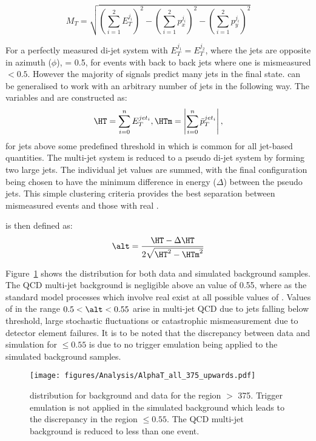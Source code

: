 \begin{equation}
  M_{T} = \sqrt{\left(\sum^{2}_{i=1}E_{T}^{j_{i}}\right)^{2} - \left(\sum^{2}_{i=1}p_{x}^{j_{i}}\right)^{2} - \left(\sum^{2}_{i=1}p_{y}^{j_{i}}\right)^{2}}
\end{equation}

For a perfectly measured di-jet system with $E_{T}^{j_{1}} = E_{T}^{j_{2}}$, 
where the jets are opposite in azimuth ($\phi$), \alt = 0.5, for events with back to back jets where one is mismeasured \alt $ < 0.5$.
However the majority of signals predict many jets in the final state.
\alt can be generalised to work with an arbitrary number of jets in the following way. The variables \HT and \HTm are constructed as:
\begin{equation}
  \HT = \sum_{i = 0}^{n}E_{T}^{jet_{i}}, \\
  \HTm = \left|\sum_{i = 0}^{n}\bar{p}_{T}^{jet_{i}}\right|,
\end{equation}
for jets above some predefined threshold in \ET which is common for all jet-based quantities. The multi-jet system is reduced to a pseudo di-jet system by forming two large jets. The individual jet \ET values are summed, with the final configuration being chosen to have the minimum difference in energy 
($\Delta$\HT) between the pseudo jets. This simple clustering criteria provides 
the best separation between mismeasured events and those with real \MET\cite{cms-pas-sus-09001}.

\alt is then defined as:
\begin{equation}
  \alt = \frac{\HT - \Delta\HT}{2\sqrt{\HT^{2}-\HTm^{2}}}
\end{equation}


Figure~\ref{fig:figures_Analysis_AlphaT_all_375_upwards} shows the \alt 
distribution for both data and simulated background samples. The QCD multi-jet 
background is negligible above an \alt value of 0.55, where as the standard 
model processes which involve real \MET exist at all possible values of \alt.
Values of \alt in the range $0.5 < \alt < 0.55$ arise in multi-jet QCD due to 
jets falling below threshold, large stochastic fluctuations or catastrophic mismeasurement due to detector element failures.
It is to be noted that the discrepancy between data and simulation for \alt 
$\leq 0.55$ is due to no trigger emulation being applied to the simulated 
background samples.
\begin{figure}[ht|]
  \centering  \texttt{[image: figures/Analysis/AlphaT\_all\_375\_upwards.pdf]}
  \caption{\alt distribution for background and data for the region \HT $>$ 
  \unit{375}{\GeV}. Trigger emulation is not applied in the simulated 
  background which leads to the discrepancy in the region \alt $\leq 0.55$. The 
  QCD multi-jet background is reduced to less than one event.}
  \label{fig:figures_Analysis_AlphaT_all_375_upwards}
\end{figure}

